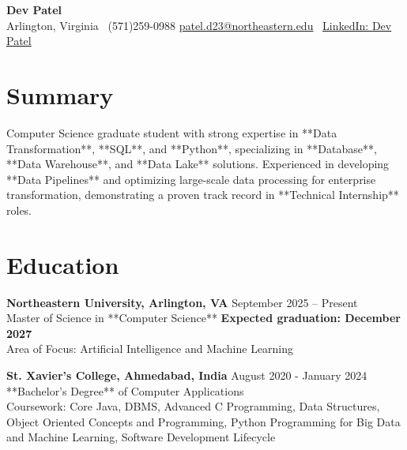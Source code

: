 \documentclass[a4paper,10pt]{article}
\begin{document}
\begin{center}
\vspace{-3mm}
    \fontsize{16}{18}\selectfont \textbf{Dev Patel} \\
    \vspace{0mm}
    \normalsize Arlington, Virginia \textbar\ (571)259-0988  \textbar       \href{mailto:patel.d23@northeastern.edu}{patel.d23@northeastern.edu} \textbar\ \href{https://www.linkedin.com/in/devxpatel//}{LinkedIn: Dev Patel} \\
\end{center}



\section*{Summary}
\vspace{-0mm}
Computer Science graduate student with strong expertise in **Data Transformation**, **SQL**, and **Python**, specializing in **Database**, **Data Warehouse**, and **Data Lake** solutions. Experienced in developing **Data Pipelines** and optimizing large-scale data processing for enterprise transformation, demonstrating a proven track record in **Technical Internship** roles.
 
\vspace{ 0 mm}
\section*{Education}
\textbf{Northeastern University, Arlington, VA} \hfill September 2025 -- Present\\
Master of Science in **Computer Science** \hfill \textbf{Expected graduation: December 2027} \\
Area of Focus: Artificial Intelligence and Machine Learning

\vspace{1 mm} %
\textbf{St. Xavier's College, Ahmedabad, India} \hfill August 2020 - January 2024 \\
**Bachelor’s Degree** of Computer Applications\\
Coursework: Core Java, DBMS, Advanced C Programming, Data Structures, Object Oriented Concepts and Programming, Python Programming for Big Data and Machine Learning, Software Development Lifecycle
\end{document}
